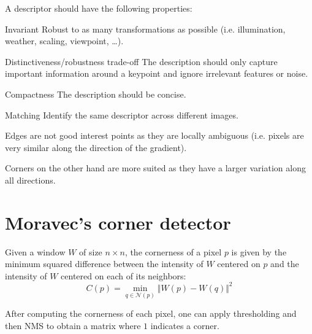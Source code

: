 \begin{description}
\begin{descriptionlist}
                A descriptor should have the following properties:
                \begin{descriptionlist}
                    \item[Invariant] Robust to as many transformations as possible (i.e. illumination, weather, scaling, viewpoint, \dots).
                    \item[Distinctiveness/robustness trade-off] The description should only capture important information around a keypoint and 
                        ignore irrelevant features or noise.
                    \item[Compactness] The description should be concise.
                \end{descriptionlist}


            \item[Matching] 
                Identify the same descriptor across different images.
        \end{descriptionlist}
\end{description}

\begin{remark}
    Edges are not good interest points as they are locally ambiguous (i.e. pixels are very similar along the direction of the gradient).

    Corners on the other hand are more suited as they have a larger variation along all directions.
\end{remark}


\section{Moravec's corner detector}

Given a window $W$ of size $n \times n$,
the cornerness of a pixel $p$ is given by the minimum squared difference between 
the intensity of $W$ centered on $p$ and the intensity of $W$ centered on each of its neighbors:
\[ C(p) = \min_{q \in \mathcal{N}(p)} \Vert W(p) - W(q) \Vert^2 \]

After computing the cornerness of each pixel, one can apply thresholding and then NMS to obtain a matrix where $1$ indicates a corner.

